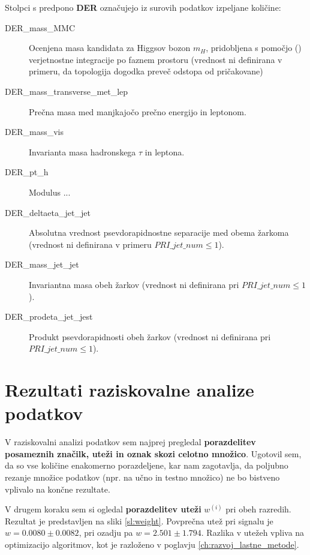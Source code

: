 \documentclass[11pt,a4paper,openany]{book}
\begin{document}
Stolpci s predpono \textbf{DER} označujejo iz surovih podatkov izpeljane količine:
\begin{changemargin}{0.5cm}{0.0cm} 
\begin{description}
	\item[DER\_mass\_MMC] Ocenjena masa kandidata za Higgsov bozon $m_H$, pridobljena s pomočjo () verjetnostne integracije po faznem prostoru (vrednost ni definirana v primeru, da topologija dogodka preveč odstopa od pričakovane)
	\item[DER\_mass\_transverse\_met\_lep] Prečna masa med manjkajočo prečno energijo in leptonom.
	\item[DER\_mass\_vis] Invarianta masa hadronskega $\tau$ in leptona.
	\item[DER\_pt\_h] Modulus ... 
	\item[DER\_deltaeta\_jet\_jet] Absolutna vrednost psevdorapidnostne separacije med obema žarkoma (vrednost ni definirana v primeru $PRI\_jet\_num \le 1$).
	\item[DER\_mass\_jet\_jet] Invariantna masa obeh žarkov (vrednost ni definirana pri $PRI\_jet\_num \le 1$).
	\item[DER\_prodeta\_jet\_jest] Produkt psevdorapidnosti obeh žarkov (vrednost ni definirana pri $PRI\_jet\_num \le 1$).
	
\end{description}
\end{changemargin}


\section{Rezultati raziskovalne analize podatkov}
\label{sec:raziskovalna-analiza}

V raziskovalni analizi podatkov sem najprej pregledal \textbf{porazdelitev posameznih značilk, uteži in oznak skozi celotno množico}. Ugotovil sem, da so vse količine enakomerno porazdeljene, kar nam zagotavlja, da poljubno rezanje množice podatkov (npr. na učno in testno množico) ne bo bistveno vplivalo na končne rezultate.

V drugem koraku sem si ogledal \textbf{porazdelitev uteži} $w^{(i)}$ pri obeh razredih. Rezultat je predstavljen na sliki \ref{sl:weight}. Povprečna utež pri signalu je $w = 0.0080 \pm 0.0082$, pri ozadju pa $w = 2.501 \pm 1.794$. Razlika v utežeh vpliva na optimizacijo algoritmov, kot je razloženo v poglavju \ref{ch:razvoj_lastne_metode}.
\end{document}
